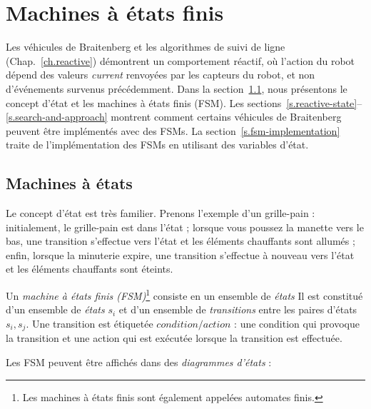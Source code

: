 
\chapter{Machines à états finis}\label{ch.fmg}

Les véhicules de Braitenberg et les algorithmes de suivi de ligne (Chap.~\ref{ch.reactive}) démontrent un comportement réactif, où l'action du robot dépend des valeurs \emph{current} renvoyées par les capteurs du robot, et non d'événements survenus précédemment. Dans la section~\ref{s.sm}, nous présentons le concept d'état et les machines à états finis (FSM). Les sections~\ref{s.reactive-state}--\ref{s.search-and-approach} montrent comment certains véhicules de Braitenberg peuvent être implémentés avec des FSMs. La section~\ref{s.fsm-implementation} traite de l'implémentation des FSMs en utilisant des variables d'état.


\section{Machines à états}\label{s.sm}

Le concept d'état est très familier. Prenons l'exemple d'un grille-pain : initialement, le grille-pain est dans l'état  ; lorsque vous poussez la manette vers le bas, une transition s'effectue vers l'état  et les éléments chauffants sont allumés ; enfin, lorsque la minuterie expire, une transition s'effectue à nouveau vers l'état  et les éléments chauffants sont éteints.

Un \emph{machine à états finis (FSM)}\footnote{Les machines à états finis sont également appelées automates finis.} consiste en un ensemble de \emph{états} Il est constitué d'un ensemble de \emph{états} $s_i$ et d'un ensemble de \emph{transitions} entre les paires d'états $s_i, s_j$. Une transition est étiquetée $\mathit{condition} / \mathit{action}$ : une condition qui provoque la transition et une action qui est exécutée lorsque la transition est effectuée.

Les FSM peuvent être affichés dans des \emph{diagrammes d'états} :
\begin{center}
\end{center}

